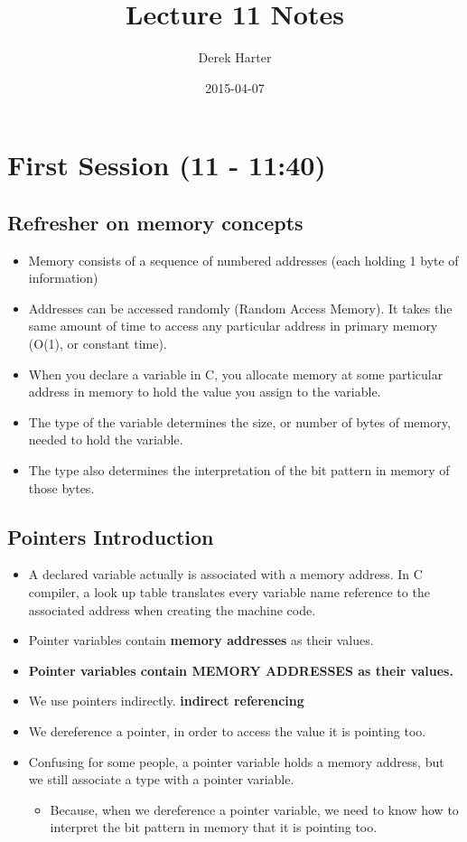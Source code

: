\documentclass[11pt]{article}
\title{Lecture 11 Notes}
\author{Derek Harter}
\date{2015-04-07}
\begin{document}
\maketitle


\section{First Session (11 - 11:40)}
\label{sec-1}
\subsection{Refresher on memory concepts}
\label{sec-1-1}

\begin{itemize}
\item Memory consists of a sequence of numbered addresses (each holding 1 byte of information)
\item Addresses can be accessed randomly (Random Access Memory).  It
  takes the same amount of time to access any particular address in
  primary memory (O(1), or constant time).
\item When you declare a variable in C, you allocate memory at some
  particular address in memory to hold the value you assign to the
  variable.
\item The type of the variable determines the size, or number of bytes
  of memory, needed to hold the variable.
\item The type also determines the interpretation of the bit pattern in
  memory of those bytes.
\end{itemize}
\subsection{Pointers Introduction}
\label{sec-1-2}

\begin{itemize}
\item A declared variable actually is associated with a memory address.  In C compiler, 
  a look up table translates every variable name reference to the associated address when
  creating the machine code.
\item Pointer variables contain \textbf{memory addresses} as their values.
\item \textbf{Pointer variables contain MEMORY ADDRESSES as their values.}
\item We use pointers indirectly. \textbf{indirect referencing}
\item We dereference a pointer, in order to access the value it is pointing too.
\item Confusing for some people, a pointer variable holds a memory address, but we still
  associate a type with a pointer variable.
\begin{itemize}
\item Because, when we dereference a pointer variable, we need to know
    how to interpret the bit pattern in memory that it is pointing
    too.
\end{itemize}
\end{itemize}
\end{document}
